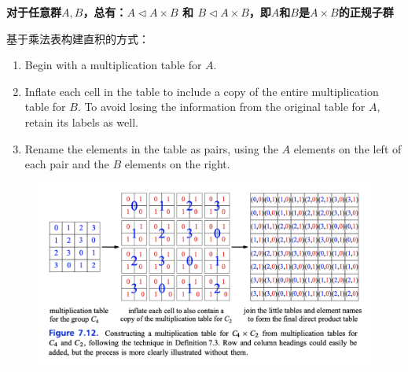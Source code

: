 \documentclass[12pt]{article}
\begin{document}
\begin{mdframed}[
linecolor=black!40,outerlinewidth=1pt,roundcorner=.5em,innertopmargin=1ex,innerbottommargin=.5\baselineskip,innerrightmargin=1em,innerleftmargin=1em,backgroundcolor=gray!5,
]
\textbf{
对于任意群$A,B$，总有：$A \lhd A \times B$ 和 $B \lhd A \times B$，即$A$和$B$是$A \times B$的正规子群
}
\end{mdframed}

\begin{mdframed}[
linecolor=black!40,outerlinewidth=1pt,roundcorner=.5em,innertopmargin=1ex,innerbottommargin=.5\baselineskip,innerrightmargin=1em,innerleftmargin=1em,backgroundcolor=gray!5,
]
基于乘法表构建直积的方式：
\begin{enumerate}
\setlength{\itemsep}{0pt}
\setlength{\parsep}{0pt}
\setlength{\parskip}{0pt}
	\item Begin with a multiplication table for $A$.
	\item Inflate each cell in the table to include a copy of the entire multiplication table for $B$. To avoid losing the information from the original table for $A$, retain its labels as well.
	\item Rename the elements in the table as pairs, using the $A$ elements on the left of each pair and the $B$ elements on the right.
\end{enumerate}
\end{mdframed}
\begin{figure}[H]
    \centering
    \includegraphics[width=1\textwidth]{fig/Group/MultiplicationTable-C4-times-C2.png}
\end{figure}
\end{document}
